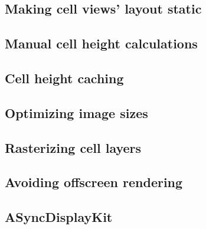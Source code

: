 \documentclass[a4paper,12pt]{article}
\begin{document}
\subsection{Making cell views' layout static}

\subsection{Manual cell height calculations}

\subsection{Cell height caching}

\subsection{Optimizing image sizes}

\subsection{Rasterizing cell layers}

\subsection{Avoiding offscreen rendering}

\subsection{ASyncDisplayKit}
\end{document}
